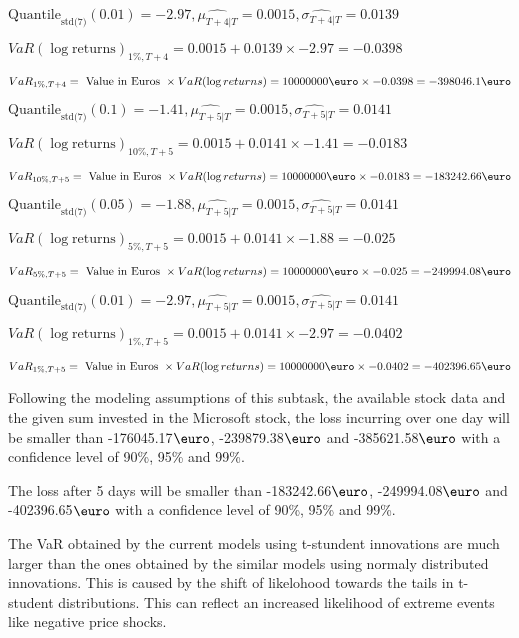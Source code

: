 $\text{Quantile}_\text{std(7)}(0.01) = -2.97,\hat{\mu_{T+4|T}} = 0.0015, \hat{\sigma_{T+4|T}} = 0.0139$

$VaR(\log \text{returns})_{1\%, T + 4} = 0.0015 + 0.0139\times-2.97 = -0.0398$

$VaR_{1\%, T + 4} = \text{ Value in Euros } \times VaR(\log returns) = 10 000 000 \text{\euro} \times-0.0398 = -398046.1 \text{\euro}$


$\text{Quantile}_\text{std(7)}(0.1) = -1.41,\hat{\mu_{T+5|T}} = 0.0015, \hat{\sigma_{T+5|T}} = 0.0141$

$VaR(\log \text{returns})_{10\%, T + 5} = 0.0015 + 0.0141\times-1.41 = -0.0183$

$VaR_{10\%, T + 5} = \text{ Value in Euros } \times VaR(\log returns) = 10 000 000 \text{\euro} \times-0.0183 = -183242.66 \text{\euro}$


$\text{Quantile}_\text{std(7)}(0.05) = -1.88,\hat{\mu_{T+5|T}} = 0.0015, \hat{\sigma_{T+5|T}} = 0.0141$

$VaR(\log \text{returns})_{5\%, T + 5} = 0.0015 + 0.0141\times-1.88 = -0.025$

$VaR_{5\%, T + 5} = \text{ Value in Euros } \times VaR(\log returns) = 10 000 000 \text{\euro} \times-0.025 = -249994.08 \text{\euro}$


$\text{Quantile}_\text{std(7)}(0.01) = -2.97,\hat{\mu_{T+5|T}} = 0.0015, \hat{\sigma_{T+5|T}} = 0.0141$

$VaR(\log \text{returns})_{1\%, T + 5} = 0.0015 + 0.0141\times-2.97 = -0.0402$

$VaR_{1\%, T + 5} = \text{ Value in Euros } \times VaR(\log returns) = 10 000 000 \text{\euro} \times-0.0402 = -402396.65 \text{\euro}$


Following the modeling assumptions of this subtask, the available stock data and the given sum invested in the Microsoft stock, the loss incurring over one day will be smaller than -176045.17$\text{\euro}$, -239879.38$\text{\euro}$  and -385621.58$\text{\euro}$  with a confidence level of 90\%, 95\%  and 99\%.

The loss after 5 days will be smaller than -183242.66$\text{\euro}$, -249994.08$\text{\euro}$  and -402396.65$\text{\euro}$  with a confidence level of 90\%, 95\%  and 99\%.

The VaR obtained by the current models using t-stundent innovations are much larger than the ones obtained by the similar models using normaly distributed innovations. This is caused by the shift of likelohood towards the tails in t-student distributions. This can reflect an increased likelihood of extreme events like negative price shocks.
